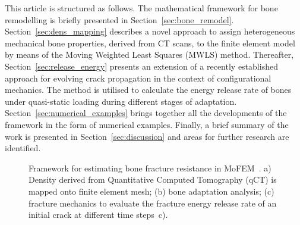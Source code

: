 \documentclass[review]{elsarticle}
\numberwithin{equation}{section}
\begin{document}


This article is structured as follows. The mathematical framework for bone remodelling is briefly presented in Section~\ref{sec:bone_remodel}.
Section~\ref{sec:dens_mapping} describes a novel approach to assign heterogeneous mechanical bone properties, derived from CT scans,
to the finite element model by means of the Moving Weighted Least Squares (MWLS) method.
Thereafter, Section~\ref{sec:release_energy} presents an extension of a recently established approach 
for evolving crack propagation in the context of configurational mechanics. The method is utilised to calculate the energy release rate of bones under quasi-static loading during different stages of adaptation. 
Section~\ref{sec:numerical_examples} brings together all the developments of the framework in the form of numerical examples. 
Finally, a brief summary of the work is presented in Section~\ref{sec:discussion} and areas for further research are identified.

\begin{figure}[h]
	\centering
\caption{Framework for estimating bone fracture resistance in MoFEM~\citep{mofem2017}. a) Density derived from Quantitative Computed Tomography (qCT) is mapped onto finite element mesh; (b) bone adaptation analysis; (c) fracture mechanics to evaluate the fracture energy release rate of an initial crack at different time steps~c).}
\label{fig:framework}
\end{figure}
\end{document}
